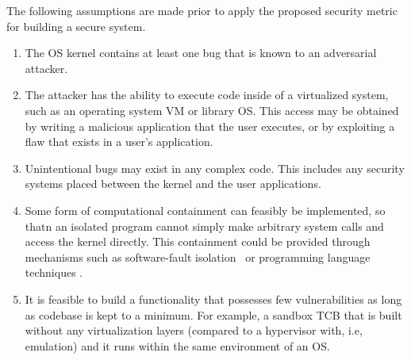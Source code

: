The following assumptions are made prior to apply the proposed security metric for building %
a secure system.

\begin{enumerate}
\item The OS kernel contains at least one bug that is known to an adversarial attacker.

\item The attacker has the ability to execute code inside
of a virtualized system, such as an operating system VM or library OS.
This access may be obtained by writing a malicious application
that the user executes, or by exploiting a flaw that exists in a user's
application.

\item Unintentional bugs may exist in any complex code. This
includes any security systems placed between the kernel and the user
applications.

\item Some form of computational containment can feasibly be implemented, so thatn an isolated program cannot simply
make arbitrary system calls and access the kernel directly. This containment could
be provided through mechanisms such as software-fault isolation~\cite{SFI:93} or programming
language techniques \cite{JS-Sandboxing1, JVM}. %

\item It is feasible to build a functionality that possesses few vulnerabilities as long as codebase is kept to a minimum. For example, a sandbox TCB that is built without any virtualization layers (compared to a hypervisor with, i.e, emulation) and it runs within the same environment of an OS.

\end{enumerate}